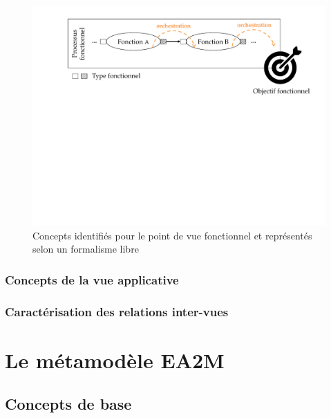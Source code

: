     \begin{figure}[!ht]
     \begin{center}
     \includegraphics[trim= 0cm 11cm 0cm 0cm, width=1\textwidth]{figures/4_demarche/concepts_vue_fonctionnelle.pdf} \end{center}
     \caption{Concepts identifiés pour le point de vue fonctionnel et représentés selon un formalisme libre}
     \label{fig:concepts_vue_fonctionnelle}
    \end{figure}

    


    \subsubsection{Concepts de la vue applicative}

    \subsubsection{Caractérisation des relations inter-vues}















\section{Le métamodèle EA2M}

    \subsection{Concepts de base}

